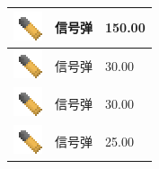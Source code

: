 \documentclass[UTF8]{ctexart}
\begin{document}
\begin{longtable}[]{|p{1cm}|p{8cm}|p{1.5cm}|}
	\hline
	\includegraphics{.workspace/icons/immersiveengineering/immersiveengineering__bullet__2.png} & 信号弹 &150.00\\
	\hline
	\includegraphics{.workspace/icons/immersiveengineering/immersiveengineering__bullet__2.png} & 信号弹 &30.00\\
	\hline
	\includegraphics{.workspace/icons/immersiveengineering/immersiveengineering__bullet__2.png} & 信号弹 &30.00\\
	\hline
	\includegraphics{.workspace/icons/immersiveengineering/immersiveengineering__bullet__2.png} & 信号弹 &25.00\\
	\hline

\end{longtable}
\end{document}
